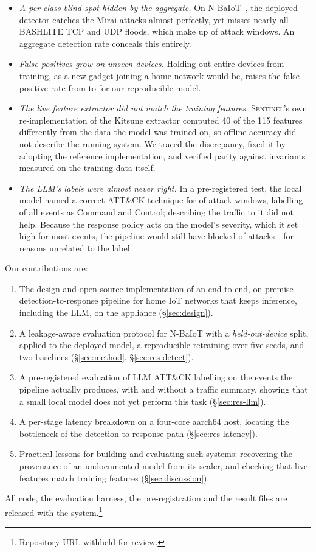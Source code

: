 \begin{itemize}
\item \emph{A per-class blind spot hidden by the aggregate.} On
  N-BaIoT~\cite{meidan2018nbaiot}, the deployed detector catches the Mirai
  attacks almost perfectly, yet misses nearly all BASHLITE TCP and UDP floods,
  which make up \NblindShare{} of attack windows. An aggregate
  detection rate conceals this entirely.
\item \emph{False positives grow on unseen devices.} Holding out entire devices
  from training, as a new gadget joining a home network would be, raises the
  false-positive rate from \NlstmFPRin{} to \NlstmFPRout{} for our
  reproducible model.
\item \emph{The live feature extractor did not match the training features.}
  \textsc{Sentinel}'s own re-implementation of the Kitsune extractor computed
  40 of the 115 features differently from the data the model was trained on,
  so offline accuracy did not describe the running system. We traced the
  discrepancy, fixed it by adopting the reference implementation, and verified
  parity against invariants measured on the training data itself.
\item \emph{The LLM's labels were almost never right.} In a pre-registered
  test, the local model named a correct ATT\&CK technique for
  \NllmAsbTech{} of attack windows, labelling \NllmCtwoShare{} of all
  events as Command and Control; describing the traffic to it did not help.
  Because the response policy acts on the model's severity, which it set high
  for most events, the pipeline would still have blocked \NllmAsbBlock{} of
  attacks---for reasons unrelated to the label.
\end{itemize}

\noindent Our contributions are:
\begin{enumerate}
\item The design and open-source implementation of an end-to-end,
  on-premise detection-to-response pipeline for home IoT networks that keeps
  inference, including the LLM, on the appliance (\S\ref{sec:design}).
\item A leakage-aware evaluation protocol for N-BaIoT with a
  \emph{held-out-device} split, applied to the deployed model, a reproducible
  retraining over five seeds, and two baselines (\S\ref{sec:method},
  \S\ref{sec:res-detect}).
\item A pre-registered evaluation of LLM ATT\&CK labelling on the events the
  pipeline actually produces, with and without a traffic summary, showing that
  a small local model does not yet perform this task (\S\ref{sec:res-llm}).
\item A per-stage latency breakdown on a four-core aarch64 host, locating the
  bottleneck of the detection-to-response path (\S\ref{sec:res-latency}).
\item Practical lessons for building and evaluating such systems: recovering
  the provenance of an undocumented model from its scaler, and checking that
  live features match training features (\S\ref{sec:discussion}).
\end{enumerate}

All code, the evaluation harness, the pre-registration and the result files
are released with the system.\footnote{Repository URL withheld for review.}
